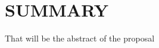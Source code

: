 \documentclass[a4paper,11pt]{article}
\begin{document}


\newpage
\setcounter{tocdepth}{1}
\setcounter{section}{-1}
\tableofcontents



\newpage
\section{SUMMARY}
\label{sec:summary}







\let\citeBk=\cite
\let\cite=\footcite
\renewcommand{\footnotesize}{\tiny}

That will be the abstract of the proposal


% 


\end{document}
